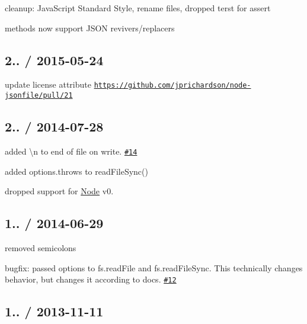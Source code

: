 \begin{DoxyItemize}
\item cleanup\+: Java\+Script Standard Style, rename files, dropped terst for assert
\item methods now support J\+S\+ON revivers/replacers
\end{DoxyItemize}

\subsection*{2.. / 2015-\/05-\/24 }


\begin{DoxyItemize}
\item update license attribute \href{https://github.com/jprichardson/node-jsonfile/pull/21}{\tt https\+://github.\+com/jprichardson/node-\/jsonfile/pull/21}
\end{DoxyItemize}

\subsection*{2.. / 2014-\/07-\/28 }


\begin{DoxyItemize}
\item added {\ttfamily \textbackslash{}n} to end of file on write. \href{https://github.com/jprichardson/node-jsonfile/pull/14}{\tt \#14}
\item added {\ttfamily options.\+throws} to {\ttfamily read\+File\+Sync()}
\item dropped support for \mbox{\hyperlink{classNode}{Node}} v0.
\end{DoxyItemize}

\subsection*{1.. / 2014-\/06-\/29 }


\begin{DoxyItemize}
\item removed semicolons
\item bugfix\+: passed {\ttfamily options} to {\ttfamily fs.\+read\+File} and {\ttfamily fs.\+read\+File\+Sync}. This technically changes behavior, but changes it according to docs. \href{https://github.com/jprichardson/node-jsonfile/issues/12}{\tt \#12}
\end{DoxyItemize}

\subsection*{1.. / 2013-\/11-\/11 }


